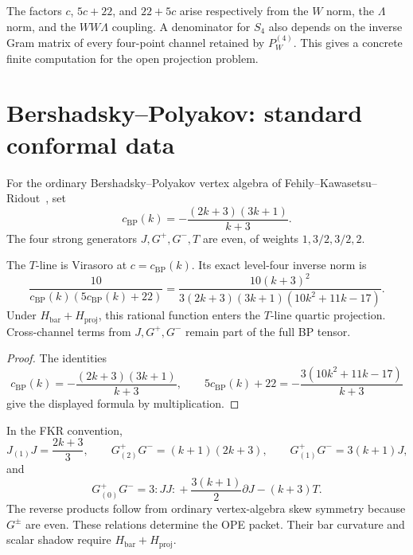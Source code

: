 \begin{remark}
\label{rem:w3-w-line-denominator-pattern}
The factors $c$, $5c+22$, and $22+5c$ arise respectively from the
$W$ norm, the $\Lambda$ norm, and the $WW\Lambda$ coupling.  A
denominator for $S_4$ also depends on the inverse Gram matrix of every
four-point channel retained by $P_W^{(4)}$.  This gives a concrete
finite computation for the open projection problem.
\end{remark}

\section{Bershadsky--Polyakov: standard conformal data}
\label{sec:bp-s3-s4-closed-forms}

\begin{definition}
\label{def:bp-arakawa-central-charge}
For the ordinary Bershadsky--Polyakov vertex algebra of
Fehily--Kawasetsu--Ridout~\cite{FKR20}, set
\begin{equation}\label{eq:bp-arakawa-central-charge}
 c_{\mathrm{BP}}(k)
 =-\frac{(2k+3)(3k+1)}{k+3}.
\end{equation}
The four strong generators $J,G^+,G^-,T$ are even, of weights
$1,3/2,3/2,2$.
\end{definition}

\begin{theorem}
\label{thm:bp-t-line-rational-k}
The $T$-line is Virasoro at $c=c_{\mathrm{BP}}(k)$.  Its exact
level-four inverse norm is
\begin{equation}\label{eq:bp-tline-s3-s4}
 \frac{10}{c_{\mathrm{BP}}(k)
 (5c_{\mathrm{BP}}(k)+22)}
 =\frac{10(k+3)^2}
 {3(2k+3)(3k+1)(10k^2+11k-17)}.
\end{equation}
Under $H_{\mathrm{bar}}+H_{\mathrm{proj}}$, this rational function
enters the $T$-line quartic projection.  Cross-channel terms from
$J,G^+,G^-$ remain part of the full BP tensor.
\end{theorem}

\begin{proof}
The identities
\[
 c_{\mathrm{BP}}(k)=-\frac{(2k+3)(3k+1)}{k+3},
 \qquad
 5c_{\mathrm{BP}}(k)+22
 =-\frac{3(10k^2+11k-17)}{k+3}
\]
give the displayed formula by multiplication.
\end{proof}

\begin{theorem}
\label{thm:bp-other-lines}
In the FKR convention,
\[
 J_{(1)}J=\frac{2k+3}{3},
 \qquad
 G^+_{(2)}G^-=(k+1)(2k+3),
 \qquad
 G^+_{(1)}G^-=3(k+1)J,
\]
and
\[
 G^+_{(0)}G^-
 =3{:JJ:}+\frac{3(k+1)}2\partial J-(k+3)T.
\]
The reverse products follow from ordinary vertex-algebra skew
symmetry because $G^\pm$ are even.  These relations determine the OPE
packet.  Their bar curvature and scalar shadow require
$H_{\mathrm{bar}}+H_{\mathrm{proj}}$.
\end{theorem}

